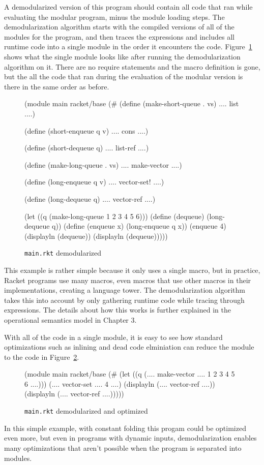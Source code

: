 A demodularized version of this program should contain all code that ran while evaluating the modular program, minus the module loading steps.
The demodularization algorithm starts with the compiled versions of all of the modules for the program, and then traces the  expressions and includes all runtime code into a single module in the order it encounters the code.
Figure~\ref{main-demod-rkt} shows what the single module looks like after running the demodularization algorithm on it.
There are no require statements and the macro definition is gone, but the all the code that ran during the evaluation of the modular version is there in the same order as before.

\begin{figure}[h]
\begin{schemedisplay}
(module main racket/base
  (#%
   (define (make-short-queue . vs)
    .... list ....)

   (define (short-enqueue q v)
    .... cons ....)

   (define (short-dequeue q)
    .... list-ref ....)

   (define (make-long-queue . vs)
    .... make-vector ....)

   (define (long-enqueue q v)
    .... vector-set! ....)

   (define (long-dequeue q)
    .... vector-ref ....)

   (let ((q (make-long-queue 1 2 3 4 5 6)))
     (define (dequeue) (long-dequeue q))
     (define (enqueue x) (long-enqueue q x))
     (enqueue 4)
     (displayln (dequeue))
     (displayln (dequeue)))))
\end{schemedisplay}
\caption{\texttt{main.rkt} demodularized}
\label{main-demod-rkt}
\end{figure}


This example is rather simple because it only uses a single macro, but in practice, Racket programs use many macros, even macros that use other macros in their implementations, creating a language tower.
The demodularization algorithm takes this into account by only gathering runtime code while tracing through  expressions.
The details about how this works is further explained in the operational semantics model in Chapter 3.

With all of the code in a single module, it is easy to see how standard optimizations such as inlining and dead code elminiation can reduce the module to the code in Figure~\ref{main-demod-opt-rkt}.
\begin{figure}[h]
\begin{schemedisplay}
(module main racket/base
  (#%
   (let ((q (.... make-vector .... 1 2 3 4 5 6 ....)))
     (.... vector-set .... 4 ....)
     (displayln (.... vector-ref ....))
     (displayln (.... vector-ref ....)))))
\end{schemedisplay}
\caption{\texttt{main.rkt} demodularized and optimized}
\label{main-demod-opt-rkt}
\end{figure}
In this simple example, with constant folding this progam could be optimized even more, but even in programs with dynamic inputs, demodularization enables many optimizations that aren't possible when the program is separated into modules.

